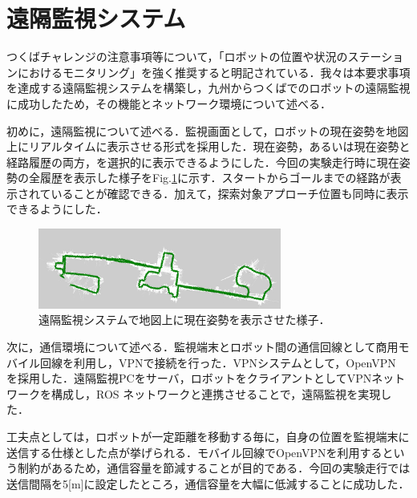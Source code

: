 \documentclass[10pt,a4paper]{jarticle}
\begin{document}
\section{遠隔監視システム}
\label{sec:remote_monitor}
つくばチャレンジの注意事項等について，「ロボットの位置や状況のステーションにおけるモニタリング」を強く推奨すると明記されている．我々は本要求事項を達成する遠隔監視システムを構築し，九州からつくばでのロボットの遠隔監視に成功したため，その機能とネットワーク環境について述べる．

初めに，遠隔監視について述べる．監視画面として，ロボットの現在姿勢を地図上にリアルタイムに表示させる形式を採用した．現在姿勢，あるいは現在姿勢と経路履歴の両方，を選択的に表示できるようにした．今回の実験走行時に現在姿勢の全履歴を表示した様子をFig.\ref{monitor}に示す．スタートからゴールまでの経路が表示されていることが確認できる．加えて，探索対象アプローチ位置も同時に表示できるようにした．

\begin{figure}
    \centering
    \includegraphics[width=8cm]{fig/png/monitor.png}
    \caption{遠隔監視システムで地図上に現在姿勢を表示させた様子．}
    \label{monitor}
\end{figure}

次に，通信環境について述べる．監視端末とロボット間の通信回線として商用モバイル回線を利用し，VPNで接続を行った．VPNシステムとして，OpenVPN \cite{openvpn} を採用した．遠隔監視PCをサーバ，ロボットをクライアントとしてVPNネットワークを構成し，ROS ネットワークと連携させることで，遠隔監視を実現した．

工夫点としては，ロボットが一定距離を移動する毎に，自身の位置を監視端末に送信する仕様とした点が挙げられる．モバイル回線でOpenVPNを利用するという制約があるため，通信容量を節減することが目的である．今回の実験走行では送信間隔を5[m]に設定したところ，通信容量を大幅に低減することに成功した．
\end{document}
